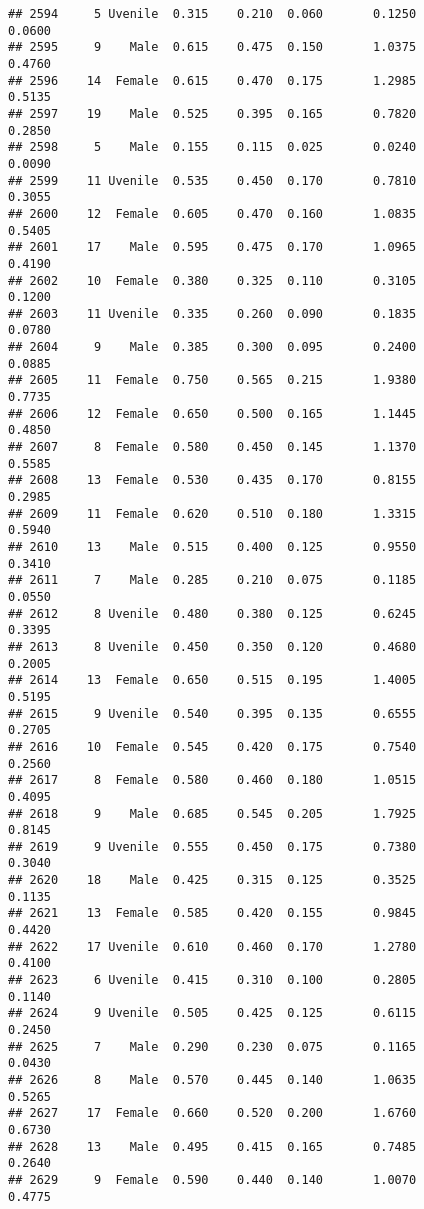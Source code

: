 \documentclass[
]{article}
\begin{document}
\begin{verbatim}
## 2594     5 Uvenile  0.315    0.210  0.060       0.1250         0.0600
## 2595     9    Male  0.615    0.475  0.150       1.0375         0.4760
## 2596    14  Female  0.615    0.470  0.175       1.2985         0.5135
## 2597    19    Male  0.525    0.395  0.165       0.7820         0.2850
## 2598     5    Male  0.155    0.115  0.025       0.0240         0.0090
## 2599    11 Uvenile  0.535    0.450  0.170       0.7810         0.3055
## 2600    12  Female  0.605    0.470  0.160       1.0835         0.5405
## 2601    17    Male  0.595    0.475  0.170       1.0965         0.4190
## 2602    10  Female  0.380    0.325  0.110       0.3105         0.1200
## 2603    11 Uvenile  0.335    0.260  0.090       0.1835         0.0780
## 2604     9    Male  0.385    0.300  0.095       0.2400         0.0885
## 2605    11  Female  0.750    0.565  0.215       1.9380         0.7735
## 2606    12  Female  0.650    0.500  0.165       1.1445         0.4850
## 2607     8  Female  0.580    0.450  0.145       1.1370         0.5585
## 2608    13  Female  0.530    0.435  0.170       0.8155         0.2985
## 2609    11  Female  0.620    0.510  0.180       1.3315         0.5940
## 2610    13    Male  0.515    0.400  0.125       0.9550         0.3410
## 2611     7    Male  0.285    0.210  0.075       0.1185         0.0550
## 2612     8 Uvenile  0.480    0.380  0.125       0.6245         0.3395
## 2613     8 Uvenile  0.450    0.350  0.120       0.4680         0.2005
## 2614    13  Female  0.650    0.515  0.195       1.4005         0.5195
## 2615     9 Uvenile  0.540    0.395  0.135       0.6555         0.2705
## 2616    10  Female  0.545    0.420  0.175       0.7540         0.2560
## 2617     8  Female  0.580    0.460  0.180       1.0515         0.4095
## 2618     9    Male  0.685    0.545  0.205       1.7925         0.8145
## 2619     9 Uvenile  0.555    0.450  0.175       0.7380         0.3040
## 2620    18    Male  0.425    0.315  0.125       0.3525         0.1135
## 2621    13  Female  0.585    0.420  0.155       0.9845         0.4420
## 2622    17 Uvenile  0.610    0.460  0.170       1.2780         0.4100
## 2623     6 Uvenile  0.415    0.310  0.100       0.2805         0.1140
## 2624     9 Uvenile  0.505    0.425  0.125       0.6115         0.2450
## 2625     7    Male  0.290    0.230  0.075       0.1165         0.0430
## 2626     8    Male  0.570    0.445  0.140       1.0635         0.5265
## 2627    17  Female  0.660    0.520  0.200       1.6760         0.6730
## 2628    13    Male  0.495    0.415  0.165       0.7485         0.2640
## 2629     9  Female  0.590    0.440  0.140       1.0070         0.4775

\end{verbatim}
\end{document}
